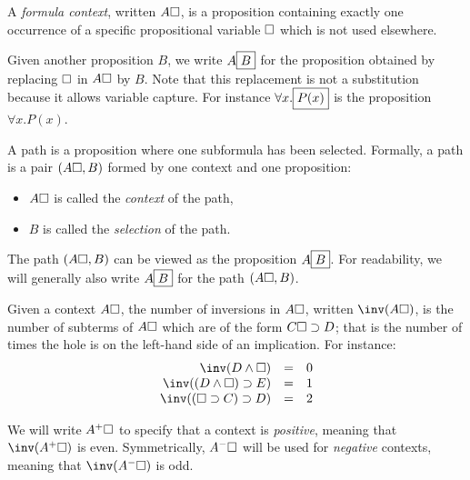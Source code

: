 \begin{definition}\label{def:formula-context}
  A \emph{formula context}, written $A\square$, is a proposition containing
  exactly one occurrence of a specific propositional variable $\square$ which is
  not used elsewhere.

  Given another proposition $B$, we write $A\fbox{$B$}$ for the
  proposition obtained by replacing $\square$ in $A\square$ by $B$. Note
  that this replacement is not a substitution because it allows variable
  capture. For instance $\forall x.\fbox{$P(x)$}$ is the proposition
  $\forall x.P(x)$.
\end{definition}

\begin{definition}[Path]\label{def:path}
A path is a proposition where one subformula has been
selected. Formally, a path is a pair $(A\square, B)$ formed by one
context and one proposition:
\begin{itemize}
\item $A\square$ is called the {\em context} of the path,
\item $B$ is called the {\em selection} of the path.
\end{itemize}

The path $(A\square, B)$ can be viewed as the proposition
$A\fbox{$B$}$.  For readability, we will generally also write
$A\fbox{$B$}$ for the path $(A\square, B)$.
\end{definition}

\begin{definition}[Inversions]
  Given a context $A\square$, the number of inversions in $A\square$,
  written $\inv(A\hole)$, is the number of subterms of $A\square$
  which are of the form $C\square\supset D$; that is the number of
  times the hole is on the left-hand side of an implication.
  For instance:
  $$
  \begin{array}{rcl}
      \inv(D\land \hole)&=& 0\\
      \inv((D\land \hole)\limp E)&=&1\\
      \inv((\hole\limp C)\limp D) &=& 2
  \end{array}
  $$
\end{definition}

\begin{definition}\label{def:polarity}
We will write $A^+\square$ to specify that a context is {\em positive},
meaning that $\inv(A^+\hole)$ is even. Symmetrically, $A^-\square$ will be
used for {\em negative} contexts, meaning that $\inv(A^-\hole)$ is odd.
\end{definition}

